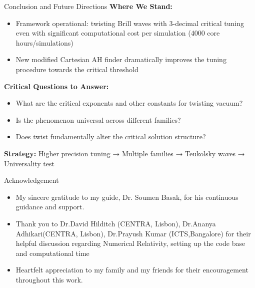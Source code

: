 \documentclass[9pt]{beamer}
\begin{document}
\begin{frame}{Conclusion and Future Directions}
    \textbf{Where We Stand:}
    \begin{itemize}
        \item Framework operational: twisting Brill waves with 3-decimal critical tuning even with significant computational cost per simulation (4000 core hours/simulations)
        \item New modified Cartesian AH finder dramatically improves the tuning procedure towards the critical threshold 
    \end{itemize}
    
    \vspace{0.3cm}
    \textbf{Critical Questions to Answer:}
    \begin{itemize}
        \item What are the critical exponents and other constants for twisting vacuum?
        \item Is the phenomenon universal across different families?
        \item Does twist fundamentally alter the critical solution structure?
    \end{itemize}
    
    \vspace{0.3cm}
    \textbf{Strategy:} Higher precision tuning → Multiple families → Teukolsky waves → Universality test
\end{frame}
\begin{frame}{Acknowledgement}
    \begin{itemize}
        \item My sincere gratitude to my guide, Dr. Soumen Basak, for his continuous guidance and support.
    \item Thank you to Dr.David Hilditch (CENTRA, Lisbon), Dr.Ananya Adhikari(CENTRA, Lisbon), Dr.Prayush Kumar (ICTS,Bangalore) for their helpful discussion regarding Numerical Relativity, setting up the code base and computational time 
    \item Heartfelt appreciation to my family and my friends for their encouragement throughout this work.
    \end{itemize}
\end{frame}
\appendix
\end{document}
